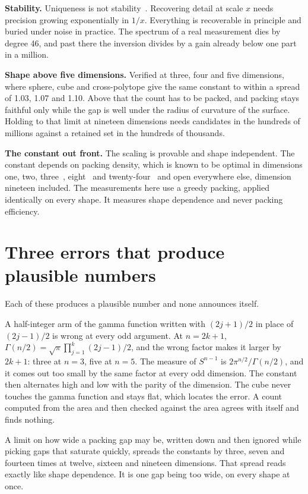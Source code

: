 \textbf{Stability.} Uniqueness is not stability~\cite{src:Mandache-2001}. Recovering detail at scale $x$ needs precision growing exponentially in $1/x$. Everything is recoverable in principle and buried under noise in practice. The spectrum of a real measurement dies by degree 46, and past there the inversion divides by a gain already below one part in a million.

\textbf{Shape above five dimensions.} Verified at three, four and five dimensions, where sphere, cube and cross-polytope give the same constant to within a spread of 1.03, 1.07 and 1.10. Above that the count has to be packed, and packing stays faithful only while the gap is well under the radius of curvature of the surface. Holding to that limit at nineteen dimensions needs candidates in the hundreds of millions against a retained set in the hundreds of thousands.

\textbf{The constant out front.} The scaling is provable and shape independent. The constant depends on packing density, which is known to be optimal in dimensions one, two, three~\cite{src:Hales-2005}, eight~\cite{src:Viazovska-2017} and twenty-four~\cite{src:Cohn-Kumar-Miller-Radchenko-and-Viazovska-2017} and open everywhere else, dimension nineteen included. The measurements here use a greedy packing, applied identically on every shape. It measures shape dependence and never packing efficiency.

\section{Three errors that produce plausible numbers}

Each of these produces a plausible number and none announces itself.

A half-integer arm of the gamma function written with $(2j+1)/2$ in place of $(2j-1)/2$ is wrong at every odd argument. At $n = 2k+1$, $\Gamma(n/2) = \sqrt{\pi}\prod_{j=1}^{k}(2j-1)/2$, and the wrong factor makes it larger by $2k+1$: three at $n = 3$, five at $n = 5$. The measure of $S^{n-1}$ is $2\pi^{n/2}/\Gamma(n/2)$, and it comes out too small by the same factor at every odd dimension. The constant then alternates high and low with the parity of the dimension. The cube never touches the gamma function and stays flat, which locates the error. A count computed from the area and then checked against the area agrees with itself and finds nothing.

A limit on how wide a packing gap may be, written down and then ignored while picking gaps that saturate quickly, spreads the constants by three, seven and fourteen times at twelve, sixteen and nineteen dimensions. That spread reads exactly like shape dependence. It is one gap being too wide, on every shape at once.

